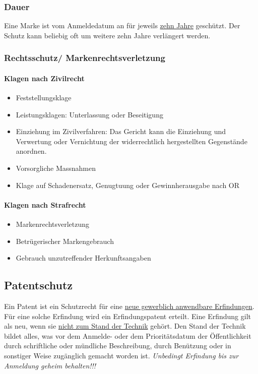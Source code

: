 \subsubsection{Dauer}
Eine Marke ist vom Anmeldedatum an für jeweils \underline{zehn Jahre} geschützt. Der Schutz kann beliebig oft um weitere zehn Jahre verlängert werden.

\subsubsection{Rechtsschutz/ Markenrechtsverletzung}
\paragraph{Klagen nach Zivilrecht}
\begin{itemize}
    \item Feststellungsklage
    \item Leistungsklagen: Unterlassung oder Beseitigung
    \item Einziehung im Zivilverfahren: Das Gericht kann die Einziehung und Verwertung oder Vernichtung der widerrechtlich hergestellten Gegenstände anordnen.
    \item Vorsorgliche Massnahmen
    \item Klage auf Schadenersatz, Genugtuung oder Gewinnherausgabe nach OR
\end{itemize}

\paragraph{Klagen nach Strafrecht}

\begin{itemize}
    \item Markenrechtsverletzung
    \item Betrügerischer Markengebrauch
    \item Gebrauch unzutreffender Herkunftsangaben
\end{itemize}

\subsection{Patentschutz}
Ein Patent ist ein Schutzrecht für eine \underline{neue gewerblich anwendbare Erfindungen}. Für eine solche Erfindung wird ein Erfindungspatent erteilt.
Eine Erfindung gilt als neu, wenn sie \underline{nicht zum Stand der Technik} gehört. Den Stand der Technik bildet alles, was vor dem Anmelde- oder dem Prioritätsdatum der Öffentlichkeit durch schriftliche oder mündliche Beschreibung, durch Benützung oder in sonstiger Weise zugänglich gemacht worden ist. \textit{Unbedingt Erfindung bis zur Anmeldung geheim behalten!!!}

